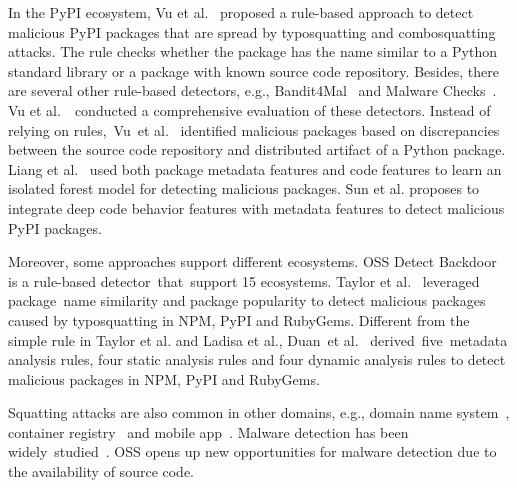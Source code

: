 In the PyPI ecosystem, Vu et al.~\cite{vu2020typosquatting} proposed a rule-based approach to detect malicious PyPI packages that are spread by typosquatting and combosquatting attacks. The rule checks whether the package has the name similar to a Python standard library or a package with known source code repository. Besides, there are several other rule-based detectors, e.g., Bandit4Mal~\cite{bandit4mal} and Malware Checks~\cite{malwarechecks}. Vu et al.~\cite{vu2023bad}~conducted a comprehensive evaluation of these detectors. %
Instead of relying on rules,~Vu~et al.~\cite{vu2020towards, vu2021lastpymile} identified malicious packages based on discrepancies between the source code repository and distributed artifact of a Python package. Liang et al.~\cite{Liang2021} used both package metadata features and code features to learn an isolated forest model for detecting malicious packages.  Sun et al. \cite{sun2024integrating} proposes to integrate deep code behavior features with metadata features to detect malicious PyPI packages. 

Moreover, some approaches support different ecosystems. OSS Detect Backdoor~\cite{Ossdetectbackdoor} is a rule-based detector~that~support 15 ecosystems. Taylor et al.~\cite{taylor2020defending} leveraged package~name similarity and package popularity to detect malicious packages caused by typosquatting in NPM, PyPI and RubyGems.  Different from the simple rule in Taylor et al. and Ladisa et al., Duan~et al.~\cite{duan2020towards} derived~five~metadata analysis rules, four static analysis rules and four dynamic analysis rules to detect malicious packages in NPM, PyPI and RubyGems. 

Squatting attacks are also common in other domains, e.g., domain name system~\cite{szurdi2014long, agten2015seven, khan2015every, kintis2017hiding, tahir2018s}, container registry~\cite{liu2022exploring} and mobile app~\cite{hu2020mobile}. Malware detection has been widely~studied~\cite{ye2017survey,guo2023empirical}. OSS opens up new opportunities for malware detection due to the availability of source code.


